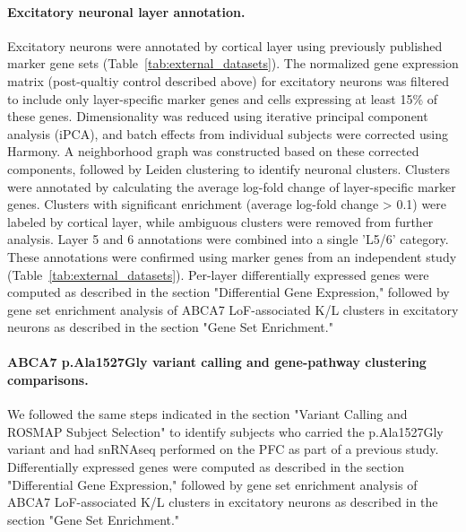 \paragraph{Excitatory neuronal layer annotation.}
Excitatory neurons were annotated by cortical layer using previously published marker gene sets \cite{He2017-dq} (Table~\ref{tab:external_datasets}). The normalized gene expression matrix (post-qualtiy control described above) for excitatory neurons was filtered to include only layer-specific marker genes and cells expressing at least 15\% of these genes. Dimensionality was reduced using iterative principal component analysis (iPCA), and batch effects from individual subjects were corrected using Harmony. A neighborhood graph was constructed based on these corrected components, followed by Leiden clustering to identify neuronal clusters. Clusters were annotated by calculating the average log-fold change of layer-specific marker genes. Clusters with significant enrichment (average log-fold change > 0.1) were labeled by cortical layer, while ambiguous clusters were  removed from further analysis. Layer 5 and 6 annotations were combined into a single 'L5/6' category. These annotations were confirmed using marker genes from an independent study \cite{Maynard2021-mz} (Table~\ref{tab:external_datasets}). Per-layer differentially expressed genes were computed as described in the section "Differential Gene Expression," followed by gene set enrichment analysis of ABCA7 LoF-associated K/L clusters in excitatory neurons as described in the section "Gene Set Enrichment."

\paragraph{ABCA7 p.Ala1527Gly variant calling and gene-pathway clustering comparisons.}
We followed the same steps indicated in the section "Variant Calling and ROSMAP Subject Selection" to identify subjects who carried the p.Ala1527Gly variant and had snRNAseq performed on the PFC as part of a previous study. Differentially expressed genes were computed as described in the section "Differential Gene Expression," followed by gene set enrichment analysis of ABCA7 LoF-associated K/L clusters in excitatory neurons as described in the section "Gene Set Enrichment."

